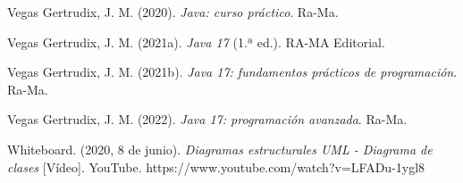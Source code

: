 \documentclass[stu,12pt,floatsintext]{apa7}
\begin{document}
\begin{thebibliography}{}
Vegas Gertrudix, J. M. (2020). \textit{Java: curso práctico}. Ra-Ma.

Vegas Gertrudix, J. M. (2021a). \textit{Java 17} (1.ª ed.). RA-MA Editorial.

Vegas Gertrudix, J. M. (2021b). \textit{Java 17: fundamentos prácticos de programación}. Ra-Ma.

Vegas Gertrudix, J. M. (2022). \textit{Java 17: programación avanzada}. Ra-Ma.

Whiteboard. (2020, 8 de junio). \textit{Diagramas estructurales UML - Diagrama de clases} [Vídeo]. YouTube. https://www.youtube.com/watch?v=LFADu-1ygl8

\end{thebibliography}
\end{document}
